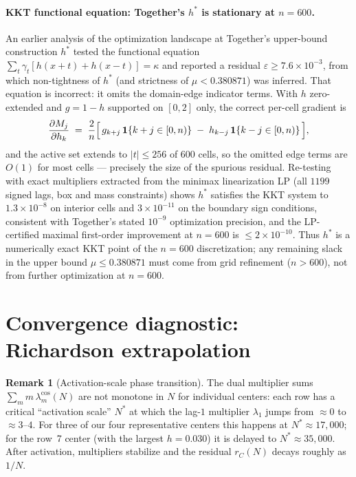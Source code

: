 \documentclass[11pt]{article}
\theoremstyle{plain}
\theoremstyle{definition}
\newtheorem{remark}[theorem]{Remark}
\begin{document}
\paragraph{KKT functional equation: Together's $h^*$ is stationary at
$n = 600$.}
An earlier analysis of the optimization landscape at Together's
upper-bound construction $h^*$ tested the functional equation
$\sum_t \gamma_t [h(x + t) + h(x - t)] = \kappa$ and reported a residual
$\varepsilon \ge 7.6 \times 10^{-3}$, from which non-tightness of $h^*$
(and strictness of $\mu < 0.380871$) was inferred. That equation is
incorrect: it omits the domain-edge indicator terms. With $h$
zero-extended and $g = 1 - h$ supported on $[0, 2]$ only, the correct
per-cell gradient is
\[
\frac{\partial M_j}{\partial h_k} \;=\; \frac{2}{n}\Bigl[\,
g_{k+j}\,\mathbf{1}\{k + j \in [0, n)\} \;-\;
h_{k-j}\,\mathbf{1}\{k - j \in [0, n)\}\,\Bigr],
\]
and the active set extends to $|t| \le 256$ of $600$ cells, so the
omitted edge terms are $O(1)$ for most cells --- precisely the size of
the spurious residual. Re-testing with exact multipliers extracted from
the minimax linearization LP (all $1199$ signed lags, box and mass
constraints) shows $h^*$ satisfies the KKT system to $1.3 \times
10^{-8}$ on interior cells and $3 \times 10^{-11}$ on the boundary sign
conditions, consistent with Together's stated $10^{-9}$ optimization
precision, and the LP-certified maximal first-order improvement at
$n = 600$ is $\le 2 \times 10^{-10}$. Thus $h^*$ is a numerically exact
KKT point of the $n = 600$ discretization; any remaining slack in the
upper bound $\mu \le 0.380871$ must come from grid refinement
($n > 600$), not from further optimization at $n = 600$.

\section{Convergence diagnostic: Richardson extrapolation}\label{sec:phase-transition}

\begin{remark}[Activation-scale phase transition]\label{rem:activation}
The dual multiplier sums $\sum_m m\, \lambda_m^{\cos}(N)$ are not
monotone in $N$ for individual centers: each row has a critical
``activation scale'' $N^*$ at which the lag-$1$ multiplier
$\lambda_1$ jumps from $\approx 0$ to $\approx 3$--$4$. For three of
our four representative centers this happens at $N^* \approx 17{,}000$;
for the row~7 center (with the largest $h = 0.030$) it is delayed to
$N^* \approx 35{,}000$. After activation, multipliers stabilize and
the residual $r_C(N)$ decays roughly as $1/N$.
\end{remark}
\end{document}
